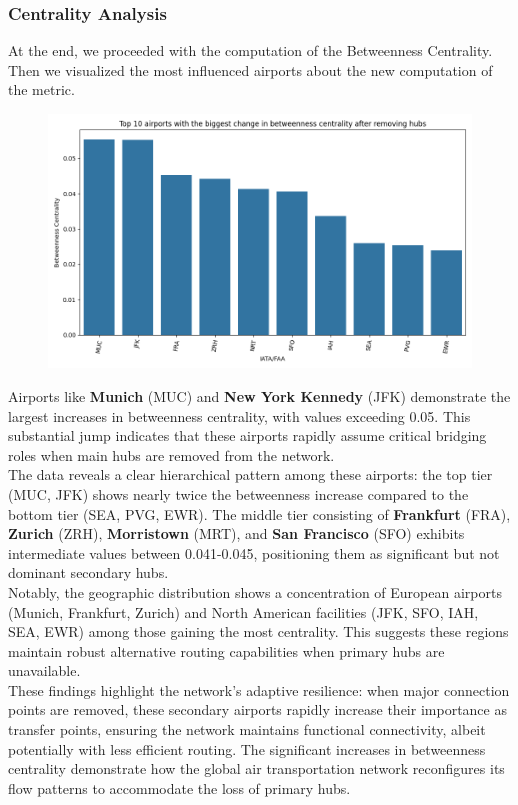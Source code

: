 \documentclass[12pt]{article}
\begin{document}
    \subsubsection{Centrality Analysis}
    At the end, we proceeded with the computation of the Betweenness Centrality. Then we visualized the most influenced airports about the new computation of the metric.

    \begin{figure}[H]
        \centering
        \includegraphics[width=0.8\linewidth]{img/biggest_changes_betweenness_centrality}
    \end{figure}
    Airports like \textbf{Munich} (MUC) and \textbf{New York Kennedy} (JFK) demonstrate the largest increases in betweenness centrality, with values exceeding 0.05. This substantial jump indicates that these airports rapidly assume critical bridging roles when main hubs are removed from the network. \\

    The data reveals a clear hierarchical pattern among these airports: the top tier (MUC, JFK) shows nearly twice the betweenness increase compared to the bottom tier (SEA, PVG, EWR). The middle tier consisting of \textbf{Frankfurt} (FRA), \textbf{Zurich} (ZRH), \textbf{Morristown} (MRT), and \textbf{San Francisco} (SFO) exhibits intermediate values between 0.041-0.045, positioning them as significant but not dominant secondary hubs. \\
    
    Notably, the geographic distribution shows a concentration of European airports (Munich, Frankfurt, Zurich) and North American facilities (JFK, SFO, IAH, SEA, EWR) among those gaining the most centrality. This suggests these regions maintain robust alternative routing capabilities when primary hubs are unavailable. \\
    
    These findings highlight the network's adaptive resilience: when major connection points are removed, these secondary airports rapidly increase their importance as transfer points, ensuring the network maintains functional connectivity, albeit potentially with less efficient routing. The significant increases in betweenness centrality demonstrate how the global air transportation network reconfigures its flow patterns to accommodate the loss of primary hubs. \\
    
\end{document}
